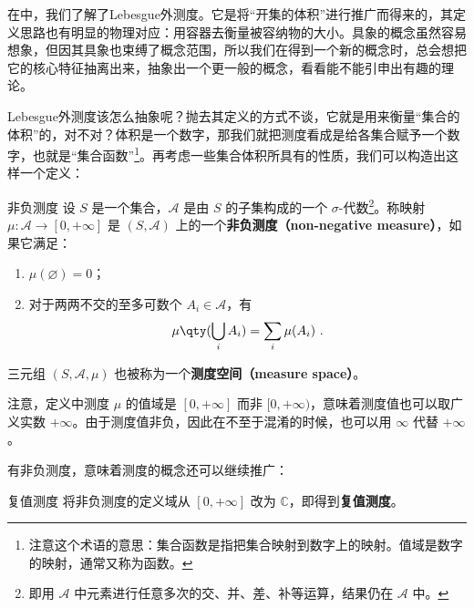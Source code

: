 

在中，我们了解了Lebesgue外测度。它是将“开集的体积”进行推广而得来的，其定义思路也有明显的物理对应：用容器去衡量被容纳物的大小。具象的概念虽然容易想象，但因其具象也束缚了概念范围，所以我们在得到一个新的概念时，总会想把它的核心特征抽离出来，抽象出一个更一般的概念，看看能不能引申出有趣的理论。

Lebesgue外测度该怎么抽象呢？抛去其定义的方式不谈，它就是用来衡量“集合的体积”的，对不对？体积是一个数字，那我们就把测度看成是给各集合赋予一个数字，也就是“集合函数”\footnote{注意这个术语的意思：集合函数是指把集合映射到数字上的映射。值域是数字的映射，通常又称为函数。}。再考虑一些集合体积所具有的性质，我们可以构造出这样一个定义：

\begin{definition}{非负测度}\label{def_GenFun_1}
设 $S$ 是一个集合，$\mathcal{A}$ 是由 $S$ 的子集构成的一个 $\sigma$-代数\footnote{即用 $\mathcal{A}$ 中元素进行任意多次的交、并、差、补等运算，结果仍在 $\mathcal{A}$ 中。}。称映射 $\mu:\mathcal{A}\to [0, +\infty]$ 是 $(S, \mathcal{A})$ 上的一个\textbf{非负测度（non-negative measure）}，如果它满足：
\begin{enumerate}
\item $\mu(\varnothing)=0$；\\
\item 对于两两不交的至多可数个 $A_i\in\mathcal{A}$，有
\begin{equation}
\mu\qty(\bigcup_i A_i) = \sum_i \mu(A_i)~.
\end{equation}
\end{enumerate}


三元组 $(S, \mathcal{A}, \mu)$ 也被称为一个\textbf{测度空间（measure space）}。

\end{definition}

注意，定义中测度 $\mu$ 的值域是 $[0, +\infty]$ 而非 $[0, +\infty)$，意味着测度值也可以取广义实数 $+\infty$。由于测度值非负，因此在不至于混淆的时候，也可以用 $\infty$ 代替 $+\infty$。

有非负测度，意味着测度的概念还可以继续推广：

\begin{definition}{复值测度}
将非负测度的定义域从 $[0, +\infty]$ 改为 $\mathbb{C}$，即得到\textbf{复值测度}。
\end{definition}

